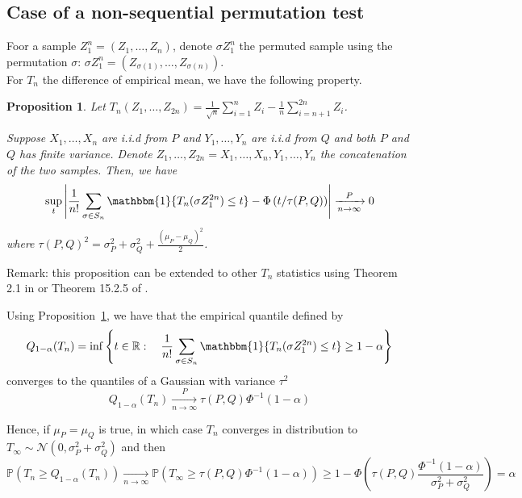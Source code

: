 \documentclass{article}
\theoremstyle{plain}
\newtheorem{Proposition}{Proposition}
\theoremstyle{remark}
\renewcommand{\P}{\mathbb{P}}
\newcommand{\R}{\mathbb{R}}
\newcommand{\1}{\mathbbm{1}}
\newcommand{\todoT}[1]{\todo[inline,color=blue!40]{{\textbf{T:}~}#1}}
\numberwithin{equation}{section}
\begin{document}
\subsection{Case of a non-sequential permutation test}

Foor a sample $Z_1^n=(Z_1,\dots,Z_n)$, denote $\sigma Z_1^n$ the permuted sample using the permutation $\sigma$: $\sigma Z_1^n=(Z_{\sigma(1)},\dots,Z_{\sigma(n)})$.\\
For $T_n$ the difference of empirical mean, we have the following property.

\begin{Proposition}\label{prop:asym_perm_test}
Let $T_n(Z_1,\dots,Z_{2n})=\frac{1}{\sqrt{n}}\sum_{i=1}^n Z_i -\frac{1}{n}\sum_{i=n+1}^{2n} Z_i$.

Suppose $X_1,\dots,X_n$ are i.i.d from $P$ and $Y_1,\dots,Y_n$ are i.i.d from $Q$ and both $P$ and $Q$ has finite variance. Denote $Z_1,\dots,Z_{2n}=X_1,\dots,X_n, Y_1,\dots,Y_n$ the concatenation of the two samples. Then, we have
$$\sup_{t}\left|\frac{1}{n!}\sum_{\sigma \in S_n} \1\{T_n(\sigma Z_{1}^{2n}) \le t\}- \Phi\left(t/\tau(P,Q) \right)\right|\xrightarrow[n \to \infty]{P} 0$$
where $\tau(P,Q)^2=\sigma_P^2+\sigma_Q^2+\frac{(\mu_P- \mu_Q)^2}{2} $.
\end{Proposition}
Remark: this proposition can be extended to other $T_n$ statistics using Theorem 2.1 in \cite{Chung_2013} or Theorem 15.2.5 of \cite{lehmann2005testing}.

Using Proposition~\ref{prop:asym_perm_test}, we have that the empirical quantile defined by
$$Q_{1-\alpha}(T_n) = \inf\left\{t \in \R:\quad \frac{1}{n!}\sum_{\sigma \in S_n} \1\{T_n(\sigma Z_{1}^{2n}) \le t\} \ge 1-\alpha\right\} $$
converges to the quantiles of a Gaussian with variance $\tau^2$
$$Q_{1-\alpha}(T_n)\xrightarrow[n \to \infty]{P} \tau(P,Q)\Phi^{-1}(1-\alpha) $$

 Hence, if $\mu_P = \mu_Q$ is true, in which case $T_n$ converges in distribution to $T_\infty\sim \mathcal{N}(0,\sigma_P^2+\sigma_Q^2 )$ and then
$$\P\left( T_n \ge Q_{1-\alpha}(T_n)\right) \xrightarrow[n \to \infty]{} \P(T_\infty\ge \tau(P,Q)\Phi^{-1}(1-\alpha)) \ge  1-\Phi\left(\tau(P,Q)\frac{\Phi^{-1}(1-\alpha)}{\sigma_P^2+\sigma_Q^2 } \right)=\alpha  $$
\end{document}
